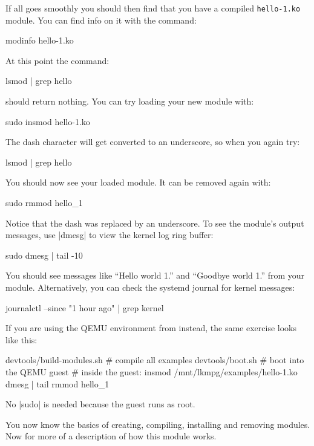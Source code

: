 \documentclass[10pt, oneside]{book}
\begin{document}
If all goes smoothly you should then find that you have a compiled \verb|hello-1.ko| module.
You can find info on it with the command:
\begin{codebash}
modinfo hello-1.ko
\end{codebash}

At this point the command:
\begin{codebash}
lsmod | grep hello
\end{codebash}

should return nothing.
You can try loading your new module with:
\begin{codebash}
sudo insmod hello-1.ko
\end{codebash}

The dash character will get converted to an underscore, so when you again try:
\begin{codebash}
lsmod | grep hello
\end{codebash}

You should now see your loaded module. It can be removed again with:
\begin{codebash}
sudo rmmod hello_1
\end{codebash}

Notice that the dash was replaced by an underscore.
To see the module's output messages, use \sh|dmesg| to view the kernel log ring buffer:
\begin{codebash}
sudo dmesg | tail -10
\end{codebash}

You should see messages like ``Hello world 1.'' and ``Goodbye world 1.'' from your module.
Alternatively, you can check the systemd journal for kernel messages:
\begin{codebash}
journalctl --since "1 hour ago" | grep kernel
\end{codebash}

If you are using the QEMU environment from  instead, the
same exercise looks like this:
\begin{codebash}
devtools/build-modules.sh        # compile all examples
devtools/boot.sh                 # boot into the QEMU guest
# inside the guest:
insmod /mnt/lkmpg/examples/hello-1.ko
dmesg | tail
rmmod hello_1
\end{codebash}
No \sh|sudo| is needed because the guest runs as root.

You now know the basics of creating, compiling, installing and removing modules.
Now for more of a description of how this module works.
\end{document}
